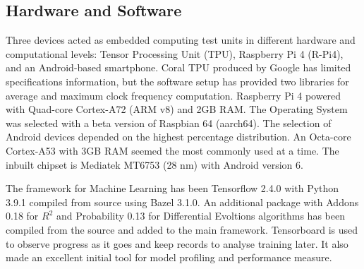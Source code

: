 \subsection{Hardware and Software} \label{subsec:soft}

%
%
Three devices acted as embedded computing test units in different hardware and computational levels: Tensor Processing Unit (TPU), Raspberry Pi 4 (R-Pi4), and an Android-based smartphone.
Coral TPU produced by Google has limited specifications information, but the software setup has provided two libraries for average and maximum clock frequency computation.
Raspberry Pi 4 powered with Quad-core Cortex-A72 (ARM v8) and 2GB RAM.
The Operating System was selected with a beta version of Raspbian 64 (aarch64).
The selection of Android devices depended on the highest percentage distribution.
An Octa-core Cortex-A53 with 3GB RAM seemed the most commonly used at a time.
The inbuilt chipset is Mediatek MT6753 (28 nm) with Android version 6.

%
%
The framework for Machine Learning has been Tensorflow 2.4.0 with Python 3.9.1 compiled from source using Bazel 3.1.0.
An additional package with Addons 0.18 for $R^2$ and Probability 0.13 for Differential Evoltions algorithms has been compiled from the source and added to the main framework.
Tensorboard is used to observe progress as it goes and keep records to analyse training later. It also made an excellent initial tool for model profiling and performance measure.

